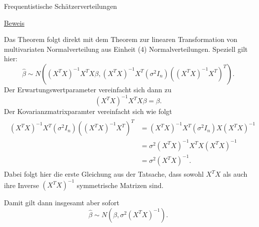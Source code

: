 \documentclass[
  8pt,
  ignorenonframetext,
]{beamer}
\begin{document}
\begin{frame}{Frequentistische Schätzerverteilungen}
\protect\hypertarget{frequentistische-schuxe4tzerverteilungen-1}{}
\footnotesize

\underline{Beweis}

Das Theorem folgt direkt mit dem Theorem zur linearen Transformation von
multivariaten Normalverteilung aus Einheit (4) Normalverteilungen.
Speziell gilt hier: \begin{equation}
\hat{\beta}
\sim
N\left(
(X^{T}X)^{-1}X^{T}X\beta,
(X^{T}X)^{-1}X^{T}(\sigma^{2}I_{n})((X^{T}X)^{-1}X^{T})^{T}
\right).
\end{equation} Der Erwartungswertparameter vereinfacht sich dann zu
\begin{equation}
(X^{T}X)^{-1}X^{T}X\beta = \beta.
\end{equation} Der Kovarianzmatrixparamter vereinfacht sich wie folgt
\begin{align}
\begin{split}
(X^{T}X)^{-1}X^{T}(\sigma^{2}I_{n})((X^{T}X)^{-1}X^{T})^{T}
&  =(X^{T}X)^{-1}X^{T}(\sigma^{2}I_{n})X(X^{T}X)^{-1}               \\
&  =\sigma^{2}(X^{T}X)^{-1}X^{T}X(X^{T}X)^{-1}                      \\
&  =\sigma^{2}(X^{T}X)^{-1}.
\end{split}
\end{align} Dabei folgt hier die erste Gleichung aus der Tatsache, dass
sowohl \(X^{T}X\) als auch ihre Inverse \((X^{T}X)^{-1}\) symmetrische
Matrizen sind.

Damit gilt dann insgesamt aber sofort \begin{equation}
\hat{\beta} \sim N\left(\beta,\sigma^2(X^T X)^{-1}\right).
\end{equation}
\end{frame}
\end{document}
